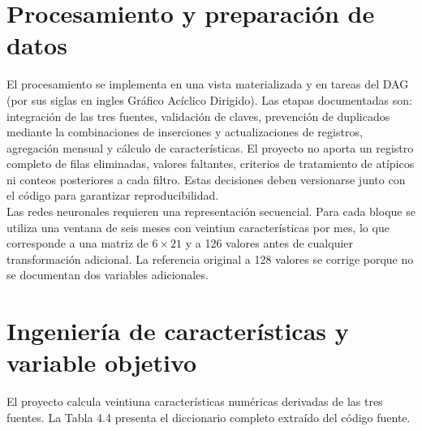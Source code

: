 \section{Procesamiento y preparación de datos}

El procesamiento se implementa en una vista materializada y en tareas del DAG (por sus siglas en ingles Gráfico Acíclico Dirigido). Las etapas documentadas son: integración de las tres fuentes, validación de claves, prevención de duplicados mediante la combinaciones de inserciones y actualizaciones de registros, agregación mensual y cálculo de características. El proyecto no aporta un registro completo de filas eliminadas, valores faltantes, criterios de tratamiento de atípicos ni conteos posteriores a cada filtro. Estas decisiones deben versionarse junto con el código para garantizar reproducibilidad.\\

Las redes neuronales requieren una representación secuencial. Para cada bloque se utiliza una ventana de seis meses con veintiun características por mes, lo que corresponde a una matriz de $6 \times 21$ y a 126 valores antes de cualquier transformación adicional. La referencia original a 128 valores se corrige porque no se documentan dos variables adicionales.

\section{Ingeniería de características y variable objetivo}

El proyecto calcula veintiuna características numéricas derivadas de las tres fuentes. La Tabla 4.4 presenta el diccionario completo extraído del código fuente.

